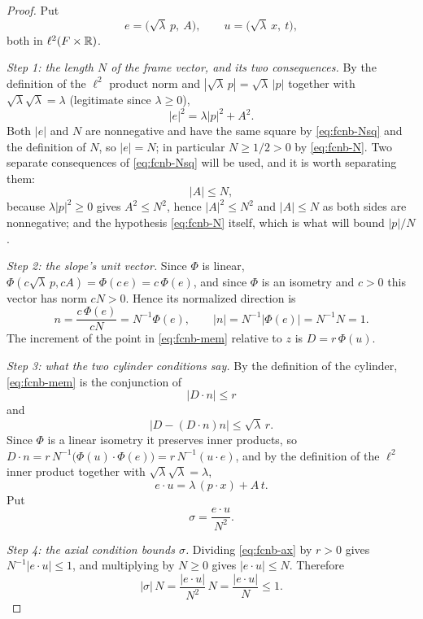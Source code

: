 \begin{proof}
Put
\[
  e=\bigl(\sqrt\lambda\,p,\ A\bigr),\qquad u=\bigl(\sqrt\lambda\,x,\ t\bigr),
\]
both in $\ell^2(F\times\mathbb{R})$.

\emph{Step 1: the length $N$ of the frame vector, and its two consequences.}
By the definition of the $\ell^2$ product norm and
$|\sqrt\lambda\,p|=\sqrt\lambda\,|p|$ together with
$\sqrt\lambda\sqrt\lambda=\lambda$ (legitimate since $\lambda\ge0$),
\begin{equation}\label{eq:fcnb-Nsq}
  |e|^2=\lambda|p|^2+A^2 .
\end{equation}
Both $|e|$ and $N$ are nonnegative and have the same square by
\eqref{eq:fcnb-Nsq} and the definition of $N$, so $|e|=N$; in particular
$N\ge1/2>0$ by \eqref{eq:fcnb-N}. Two separate consequences of
\eqref{eq:fcnb-Nsq} will be used, and it is worth separating them:
\begin{equation}\label{eq:fcnb-AN}
  |A|\le N,
\end{equation}
because $\lambda|p|^2\ge0$ gives $A^2\le N^2$, hence $|A|^2\le N^2$ and
$|A|\le N$ as both sides are nonnegative; and the hypothesis
\eqref{eq:fcnb-N} itself, which is what will bound $|p|/N$.

\emph{Step 2: the slope's unit vector.}
Since $\Phi$ is linear, $\Phi(c\sqrt\lambda\,p,cA)=\Phi(c\,e)=c\,\Phi(e)$, and
since $\Phi$ is an isometry and $c>0$ this vector has norm $cN>0$. Hence its
normalized direction is
\[
  n=\frac{c\,\Phi(e)}{cN}=N^{-1}\Phi(e),\qquad |n|=N^{-1}|\Phi(e)|=N^{-1}N=1 .
\]
The increment of the point in \eqref{eq:fcnb-mem} relative to $z$ is
$D=r\,\Phi(u)$.

\emph{Step 3: what the two cylinder conditions say.}
By the definition of the cylinder, \eqref{eq:fcnb-mem} is the conjunction of
\begin{equation}\label{eq:fcnb-ax}
  |D\cdot n|\le r
\end{equation}
and
\begin{equation}\label{eq:fcnb-tr}
  \bigl|D-(D\cdot n)n\bigr|\le\sqrt\lambda\,r .
\end{equation}
Since $\Phi$ is a linear isometry it preserves inner products, so
$D\cdot n=r\,N^{-1}\bigl(\Phi(u)\cdot\Phi(e)\bigr)=r\,N^{-1}(u\cdot e)$, and by
the definition of the $\ell^2$ inner product together with
$\sqrt\lambda\sqrt\lambda=\lambda$,
\[
  e\cdot u=\lambda\,(p\cdot x)+A\,t .
\]
Put
\[
  \sigma=\frac{e\cdot u}{N^2}.
\]

\emph{Step 4: the axial condition bounds $\sigma$.}
Dividing \eqref{eq:fcnb-ax} by $r>0$ gives $N^{-1}|e\cdot u|\le1$, and
multiplying by $N\ge0$ gives $|e\cdot u|\le N$. Therefore
\begin{equation}\label{eq:fcnb-sg}
  |\sigma|\,N=\frac{|e\cdot u|}{N^2}\,N=\frac{|e\cdot u|}{N}\le1 .
\end{equation}


\end{proof}

